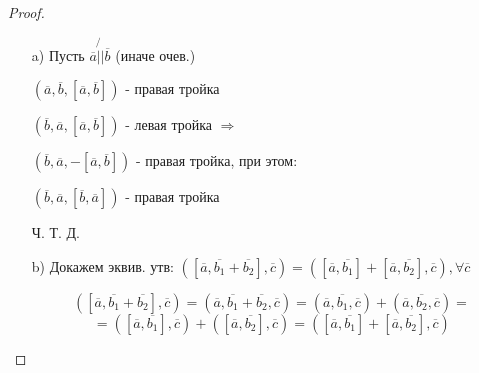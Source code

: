 \begin{proof}
  \begin{itemize}
    \item[a) ]
Пусть $\overline{a} \not{||} \overline{b}$ (иначе очев.)

$(\overline{a}, \overline{b}, [\overline{a}, \overline{b}])$ - правая тройка

$(\overline{b}, \overline{a}, [\overline{a}, \overline{b}])$ - левая тройка $\Rightarrow$

$(\overline{b}, \overline{a}, -[\overline{a}, \overline{b}])$ - правая тройка, при этом: 

$(\overline{b}, \overline{a}, [\overline{b}, \overline{a}])$  - правая тройка

Ч. Т. Д.

  \item [b) ] Докажем эквив. утв: $([\overline{a}, \overline{b_1} + \overline{b_2}], \overline{c}) = ([\overline{a}, \overline{b_1}] + [\overline{a}, \overline{b_2}], \overline{c}), \forall \overline{c}$

    \[
      ([\overline{a}, \overline{b_1} + \overline{b_2}], \overline{c}) = (\overline{a}, \overline{b_1} + \overline{b_2}, \overline{c}) = (\overline{a}, \overline{b_1}, \overline{c}) + (\overline{a}, \overline{b_2}, \overline{c}) = 
    \]
    \[
     = ([\overline{a}, \overline{b_1}], \overline{c}) + ([\overline{a}, \overline{b_2}], \overline{c})= ([\overline{a}, \overline{b_1}] + [\overline{a}, \overline{b_2}], \overline{c}) 
    \]
\end{itemize}
\end{proof}

